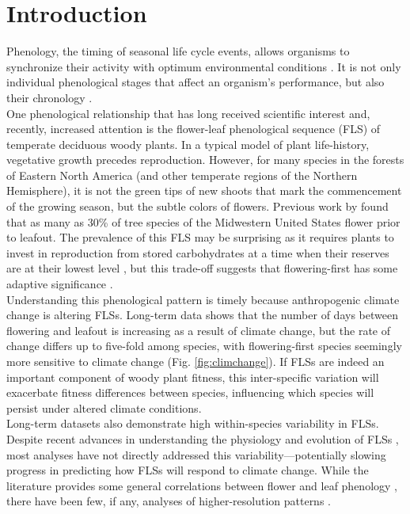 \documentclass[11pt]{article}
\begin{document}
\section*{Introduction}
Phenology, the timing of seasonal life cycle events, allows organisms to synchronize their activity with optimum environmental conditions \citep{Forrest2010}. It is not only individual phenological stages that affect an organism's performance, but also their chronology \citep{Firmat2017,Vitasse2010,Ettinger2018}.\\

\noindent One phenological relationship that has long received scientific interest \citep[see][]{Robertson1895} and, recently, increased attention \citep[e.g.][]{Savage2019, Gougherty2018} is the flower-leaf phenological sequence (FLS) of temperate deciduous woody plants. In a typical model of plant life-history, vegetative growth precedes reproduction. However, for many species in the forests of Eastern North America (and other temperate regions of the Northern Hemisphere), it is not the green tips of new shoots that mark the commencement of the growing season, but the subtle colors of flowers. Previous work by \citet{Gougherty2018} found that as many as 30\% of tree species of the Midwestern United States flower prior to leafout. The prevalence of this FLS may be surprising as it requires plants to invest in reproduction from stored carbohydrates at a time when their reserves are at their lowest level \citep{Primack1987}, but this trade-off suggests that flowering-first has some adaptive significance \citep{Rathcke_1985}.\\

\noindent Understanding this phenological pattern is timely because anthropogenic climate change is altering FLSs. Long-term data shows that the number of days between flowering and leafout is increasing as a result of climate change, but the rate of change differs up to five-fold among species, with flowering-first species seemingly more sensitive  to climate change (Fig. \ref{fig:climchange}). If FLSs are indeed an important component of woody plant fitness, this inter-specific variation will exacerbate fitness differences between species, influencing which species will persist under altered climate conditions.\\ 

\noindent Long-term datasets also demonstrate high within-species variability in FLSs. Despite recent advances in understanding the physiology and evolution of FLSs \citep{Gougherty2018,Savage2019}, most analyses have not directly addressed this variability---potentially slowing progress in predicting how FLSs will respond to climate change. While the literature provides some general correlations between flower and leaf phenology \citep[e.g.][]{Lechowicz_1995, Ettinger2018}, there have been few, if any, analyses of higher-resolution patterns \citep{Gougherty2018}. \\
\end{document}
